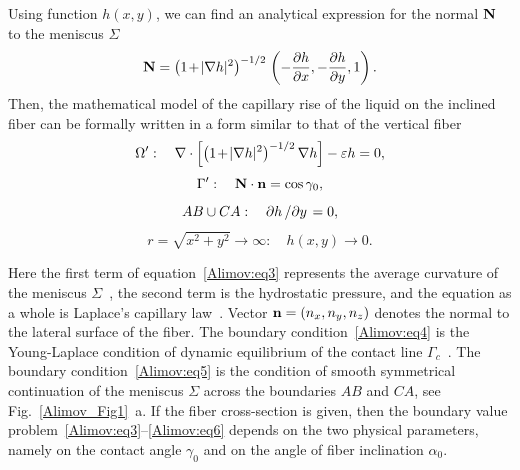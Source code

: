 \documentclass[
11pt,%
tightenlines,%
twoside,%
onecolumn,%
nofloats,%
nobibnotes,%
nofootinbib,%
superscriptaddress,%
noshowpacs,%
centertags]%
{revtex4-2}
\begin{document}
Using function $h(x,y)$, we can find an analytical expression for the normal ${\rm {\bf N}}$ to the
meniscus $\Sigma$~\cite{Alimov:bib11}
\begin{equation}
\label{Alimov:eq2} {\rm {\bf N}} = \left( {1\hspace{-0.5mm}+\hspace{-0.5mm}\vert \nabla h\vert^2}
\right)^{-1 \left/ 2 \right.} \left( {- \frac{\partial h}{\partial x}, - \frac{\partial h}{\partial
y}, 1} \right).
\end{equation}
Then, the mathematical model of the capillary rise of the liquid on the inclined fiber can be formally
written in a form similar to that of the vertical fiber~\cite{Alimov:bib5}
\begin{equation}
\label{Alimov:eq3} {\Omega }':\quad \nabla \cdot \left[ {\left(
1\hspace{-0.5mm}+\hspace{-0.5mm}\vert \nabla h \vert^{2} \right)^{-1/2} \nabla h } \right] -
\varepsilon h = 0,
\end{equation}
\begin{equation}
\label{Alimov:eq4} {\Gamma }':\quad {\rm {\bf N}} \cdot {\rm {\bf n}} = \cos \gamma _0,
\end{equation}
\begin{equation}
\label{Alimov:eq5} AB \cup CA:\quad {\partial h} \left/{\partial y} \right. = 0,
\end{equation}
\begin{equation}
\label{Alimov:eq6} r = \sqrt {x^2 + y^2} \to \infty : \quad h(x,y) \to 0.
\end{equation}

Here the first term of equation~\eqref{Alimov:eq3} represents the average curvature of the meniscus
$\Sigma$~\cite{Alimov:bib11}, the second term is the hydrostatic pressure, and the equation as a
whole is Laplace's capillary law~\cite{Alimov:bib12}. Vector ${\rm {\bf n}} = \left( {n_x, n_y, n_z
} \right)$ denotes the normal to the lateral surface of the fiber. The boundary
condition~\eqref{Alimov:eq4} is the Young-Laplace condition of dynamic equilibrium of the contact
line $\Gamma_c $~\cite{Alimov:bib1}. The boundary condition~\eqref{Alimov:eq5} is the condition of
smooth symmetrical continuation of the meniscus $\Sigma$ across the boundaries $AB$ and $CA$, see
Fig.~\ref{Alimov_Fig1}~a. If the fiber cross-section is given, then the boundary value
problem~\eqref{Alimov:eq3}--\eqref{Alimov:eq6} depends on the two physical parameters, namely on
the contact angle $\gamma_0$ and on the angle of fiber inclination $\alpha_0$.
\end{document}
